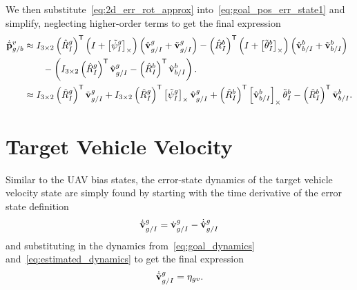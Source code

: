 We then substitute~\eqref{eq:2d_err_rot_approx}
into~\eqref{eq:goal_pos_err_state1} and simplify, neglecting higher-order terms
to get the final expression
\begin{align}
  \dot{\tilde{\mathrm{\mathbf{p}}}}_{g/b}^{v}
  &\approx
  I_{3 \times 2} \left( \hat{R}_{I}^{g} \right)^{\mathsf{T}}
  \left( I + \left[ \tilde{\psi}_I^g \right]_{\times} \right)
  \left( \hat{\mathrm{\mathbf{v}}}_{g/I}^{g} + \tilde{\mathrm{\mathbf{v}}}_{g/I}^{g} \right)
  - \left( \hat{R}_{I}^{b} \right)^{\mathsf{T}}
  \left( I + \left[ \tilde{\mathrm{\mathbf{\theta}}}_I^b \right]_{\times} \right)
  \left( \hat{\mathrm{\mathbf{v}}}_{b/I}^{b} + \tilde{\mathrm{\mathbf{v}}}_{b/I}^{b} \right) \\
  & \qquad -
  \left(
  I_{3 \times 2} \left( \hat{R}_{I}^{g} \right)^{\mathsf{T}}
  \hat{\mathrm{\mathbf{v}}}_{g/I}^{g} - \left( \hat{R}_{I}^{b} \right)^{\mathsf{T}}
  \hat{\mathrm{\mathbf{v}}}_{b/I}^{b}
  \right). \nonumber \\
  &\approx
  I_{3 \times 2} \left( \hat{R}_{I}^{g} \right)^{\mathsf{T}}
  \tilde{\mathrm{\mathbf{v}}}_{g/I}^g
  +
  I_{3 \times 2} \left( \hat{R}_{I}^{g} \right)^{\mathsf{T}}
  \left[  \tilde{\psi}_I^g  \right]_{\times} \hat{\mathrm{\mathbf{v}}}_{g/I}^g
  +
  \left( \hat{R}_{I}^{b} \right)^{\mathsf{T}} \left[  \hat{\mathrm{\mathbf{v}}}_{b/I}^{b}  \right]_{\times} 
  \tilde{\mathrm{\mathbf{\theta}}}_I^b
  -
  \left( \hat{R}_{I}^{b} \right)^{\mathsf{T}} \tilde{\mathrm{\mathbf{v}}}_{b/I}^{b} .
\end{align}

\section{Target Vehicle Velocity}
Similar to the UAV bias states, the error-state dynamics of the target vehicle
velocity state are simply found by starting with the time derivative of the
error state definition
\begin{equation}
  \dot{\tilde{\mathrm{\mathbf{v}}}}_{g/I}^g = \dot{\mathrm{\mathbf{v}}}_{g/I}^g -
  \dot{\hat{\mathrm{\mathbf{v}}}}_{g/I}^g
\end{equation}
and substituting in the dynamics from~\eqref{eq:goal_dynamics}
and~\eqref{eq:estimated_dynamics} to get the final expression
\begin{equation}
  \dot{\tilde{\mathrm{\mathbf{v}}}}_{g/I}^g = \mathrm{\mathbf{\eta}}_{gv}.
\end{equation}

